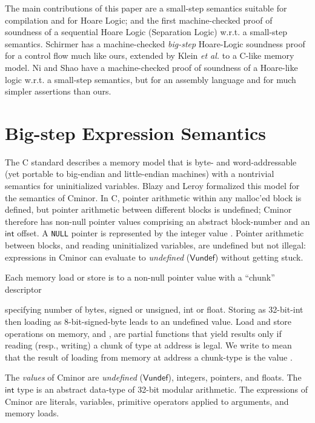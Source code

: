 \documentclass{llncs}
\newcommand{\cminor}{Cminor}
\newcommand{\tyface}[1]{\ensuremath{\mathsf{#1}}}
\begin{document}
The main contributions of this paper are
a small-step semantics suitable for
compilation and for Hoare Logic; and
the first machine-checked proof of soundness of 
a sequential Hoare Logic (Separation Logic) w.r.t.
a small-step semantics.
Schirmer \cite{schirmer06:phd} has a machine-checked \emph{big-step}
Hoare-Logic soundness proof for a control flow much like ours,
extended by Klein \emph{et al.}  \cite{Klein:POPL07} to a
C-like memory model.
Ni and Shao \cite{Shao:popl06} have a machine-checked proof of soundness of a Hoare-like logic w.r.t.
a small-step semantics, but for an assembly language and for much simpler assertions
than ours.

\section{Big-step Expression Semantics}\label{big-step}

The C standard \cite{ansi88c} describes a memory model
that is byte- and word-addressable
(yet portable to big-endian and little-endian machines)
with a nontrivial semantics
for uninitialized variables.
Blazy and Leroy formalized this model
\cite{blazy05:icfem} for the semantics of \cminor.
In C, pointer
arithmetic within any 
malloc'ed block is defined, but pointer arithmetic between different
blocks is undefined; \cminor{} therefore has non-null pointer values
comprising an abstract block-number and an \tyface{int} offset.
A \texttt{NULL} pointer is represented by the integer value .
Pointer arithmetic between blocks, and
reading uninitialized variables, are undefined but not 
illegal: expressions in \cminor{} can evaluate to
\emph{undefined} (\tyface{Vundef}) without getting stuck.  

Each memory load or store is to a non-null
pointer value 
with a ``chunk'' descriptor

specifying number of bytes,
signed or unsigned, int or float.
Storing as 32-bit-int then loading as 8-bit-signed-byte
leads to an undefined value.
Load and store operations on memory,
 and 
,
are partial functions that yield results 
only if reading (resp., writing)
a chunk of type  at address  is legal.
We write  to mean
that the result of loading from memory  at address 
a chunk-type  is the value .

The \emph{values} of \cminor{} are \emph{undefined} (\tyface{Vundef}),
integers, pointers, and floats.  The \tyface{int} type
is an abstract data-type of 32-bit modular arithmetic.
The expressions of \cminor{} are literals, variables,
primitive operators applied to arguments,
and memory loads. 
\end{document}
